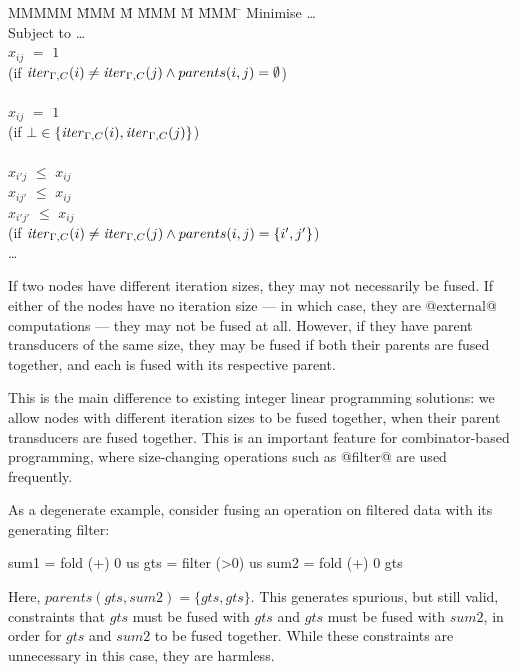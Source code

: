 \begin{tabbing}
MMMMM   \= MMM \= M \= MMM \= M \= MMM \= \kill
Minimise   \> \ldots \\
Subject to \> \ldots \\
           \> $x_{ij}$    \> $=$   \> $1$             \>       \>            \\
           \> (if $\mathit{iter}_{\Gamma,C}(i) \not= \mathit{iter}_{\Gamma,C}(j) \wedge parents(i,j) = \emptyset$)  \\
           \\
           \> $x_{ij}$    \> $=$   \> $1$             \>       \>            \\
           \> (if $\bot \in \{\mathit{iter}_{\Gamma,C}(i), \mathit{iter}_{\Gamma,C}(j)\}$)  \\
           \\
           \> $x_{i'j}$   \> $\le$ \> $x_{ij}$        \>       \>            \\
           \> $x_{ij'}$   \> $\le$ \> $x_{ij}$        \>       \>            \\
           \> $x_{i'j'}$   \> $\le$ \> $x_{ij}$        \>       \>            \\
           \> (if $\mathit{iter}_{\Gamma,C}(i) \not= \mathit{iter}_{\Gamma,C}(j) \wedge parents(i,j) = \{i',j'\}$) \\
           \> \ldots
\end{tabbing}
If two nodes have different iteration sizes, they may not necessarily be fused.
If either of the nodes have no iteration size --- in which case, they are @external@ computations --- they may not be fused at all.
However, if they have parent transducers of the same size, they may be fused if both their parents are fused together, and each is fused with its respective parent.

This is the main difference to existing integer linear programming solutions: we allow nodes with different iteration sizes to be fused together, when their parent transducers are fused together.
This is an important feature for combinator-based programming, where size-changing operations such as @filter@ are used frequently.

As a degenerate example, consider fusing an operation on filtered data with its generating filter:
\begin{code}
 sum1 = fold (+) 0  us
 gts  = filter (>0) us
 sum2 = fold (+) 0  gts
\end{code}
Here, $parents(gts,sum2) = \{gts, gts\}$.
This generates spurious, but still valid, constraints that $gts$ must be fused with $gts$ and $gts$ must be fused with $sum2$, in order for $gts$ and $sum2$ to be fused together.
While these constraints are unnecessary in this case, they are harmless.


